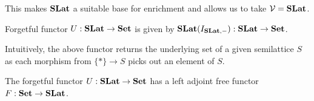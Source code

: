   This makes $\mathbf{SLat}$ a suitable base for enrichment and allows us to take $\mathcal{V} = \mathbf{SLat}$.

  \begin{definition}
    Forgetful functor $U : \mathbf{SLat} \to \mathbf{Set}$ is given by $\mathbf{SLat}(I_{\mathbf{SLat}, -}) : \mathbf{SLat} \to \mathbf{Set}$.
    \end{definition}
    
    Intuitively, the above functor returns the underlying set of a given semilattice $S$ as each morphism from $\{*\} \to S$ picks out an element of $S$.
    
    \begin{proposition}
      The forgetful functor $U : \mathbf{SLat} \to \mathbf{Set}$ has a left adjoint free functor $F : \mathbf{Set} \to \mathbf{SLat}$.
    \end{proposition}
